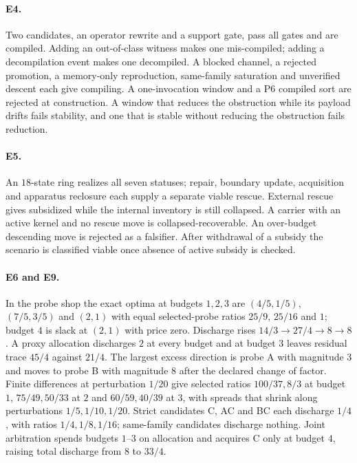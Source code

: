 \paragraph{E4.} Two candidates, an operator rewrite and a support gate, pass all gates and are
compiled. Adding an out-of-class witness makes one mis-compiled; adding a decompilation event makes
one decompiled. A blocked channel, a rejected promotion, a memory-only reproduction, same-family
saturation and unverified descent each give compiling. A one-invocation window and a P6 compiled
sort are rejected at construction. A window that reduces the obstruction while its payload drifts
fails stability, and one that is stable without reducing the obstruction fails reduction.

\paragraph{E5.} An $18$-state ring realizes all seven statuses; repair, boundary update, acquisition
and apparatus reclosure each supply a separate viable rescue. External rescue gives subsidized while
the internal inventory is still collapsed. A carrier with an active kernel and no rescue move is
collapsed-recoverable. An over-budget descending move is rejected as a falsifier. After withdrawal of
a subsidy the scenario is classified viable once absence of active subsidy is checked.

\paragraph{E6 and E9.} In the probe shop the exact optima at budgets $1, 2, 3$ are $(4/5, 1/5)$,
$(7/5, 3/5)$ and $(2, 1)$ with equal selected-probe ratios $25/9$, $25/16$ and $1$; budget $4$ is
slack at $(2, 1)$ with price zero. Discharge rises $14/3 \to 27/4 \to 8 \to 8$. A proxy allocation
discharges $2$ at every budget and at budget $3$ leaves residual trace $45/4$ against $21/4$. The
largest excess direction is probe A with magnitude $3$ and moves to probe B with magnitude $8$ after
the declared change of factor. Finite differences at perturbation $1/20$ give selected ratios
$100/37, 8/3$ at budget $1$, $75/49, 50/33$ at $2$ and $60/59, 40/39$ at $3$, with spreads that shrink
along perturbations $1/5, 1/10, 1/20$. Strict candidates C, AC and BC each discharge $1/4$, with
ratios $1/4, 1/8, 1/16$; same-family candidates discharge nothing. Joint arbitration spends budgets
$1$--$3$ on allocation and acquires C only at budget $4$, raising total discharge from $8$ to $33/4$.

